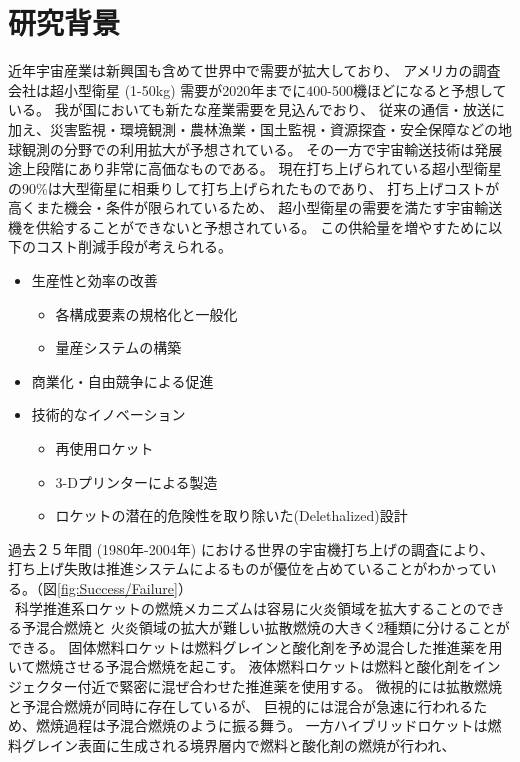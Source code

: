\section{研究背景}
%
%
近年宇宙産業は新興国も含めて世界中で需要が拡大しており、
アメリカの調査会社は超小型衛星 (1-50kg) 需要が2020年までに400-500機ほどになると予想している。\cite{nano/micro}
我が国においても新たな産業需要を見込んでおり、
従来の通信・放送に加え、災害監視・環境観測・農林漁業・国土監視・資源探査・安全保障などの地球観測の分野での利用拡大が予想されている。
その一方で宇宙輸送技術は発展途上段階にあり非常に高価なものである。
現在打ち上げられている超小型衛星の90\%は大型衛星に相乗りして打ち上げられたものであり、
打ち上げコストが高くまた機会・条件が限られているため、
超小型衛星の需要を満たす宇宙輸送機を供給することができないと予想されている。
この供給量を増やすために以下のコスト削減手段が考えられる。
\begin{itemize}
	\item 生産性と効率の改善
	\begin{itemize}
		\item 各構成要素の規格化と一般化
		\item 量産システムの構築
	\end{itemize}
	\item 商業化・自由競争による促進
	\item 技術的なイノベーション
	\begin{itemize}
		\item 再使用ロケット
		\item 3-Dプリンターによる製造
		\item ロケットの潜在的危険性を取り除いた(Delethalized)設計 
	\end{itemize}
\end{itemize}
過去２５年間 (1980年-2004年) における世界の宇宙機打ち上げの調査により、
打ち上げ失敗は推進システムによるものが優位を占めていることがわかっている。（図\ref{fig:Success/Failure}）\cite{failure}
\\
\ 
科学推進系ロケットの燃焼メカニズムは容易に火炎領域を拡大することのできる予混合燃焼と
火炎領域の拡大が難しい拡散燃焼の大きく2種類に分けることができる。
固体燃料ロケットは燃料グレインと酸化剤を予め混合した推進薬を用いて燃焼させる予混合燃焼を起こす。
液体燃料ロケットは燃料と酸化剤をインジェクター付近で緊密に混ぜ合わせた推進薬を使用する。
微視的には拡散燃焼と予混合燃焼が同時に存在しているが、
巨視的には混合が急速に行われるため、燃焼過程は予混合燃焼のように振る舞う。
一方ハイブリッドロケットは燃料グレイン表面に生成される境界層内で燃料と酸化剤の燃焼が行われ、
